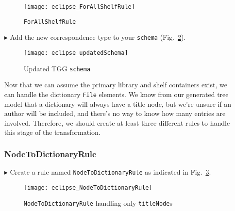\begin{itemize}
\vspace{0.5cm}

\begin{figure}[htbp]
\begin{center}
  \texttt{[image: eclipse\_ForAllShelfRule]}
  \caption{\texttt{ForAllShelfRule}}
  \label{eclipse:ForAllShelvesRule}
\end{center}
\end{figure}

\item[$\blacktriangleright$] Add the new correspondence type to your \texttt{schema} (Fig.~\ref{eclipse:updatedSchema}).

\vspace{0.5cm}

\begin{figure}[h!]
\begin{center}
  \texttt{[image: eclipse\_updatedSchema]}
  \caption{Updated TGG \texttt{schema}}
  \label{eclipse:updatedSchema}
\end{center}
\end{figure}

\newpage

Now that we can assume the primary library and shelf containers exist, we can handle the dictionary \texttt{File} elements. We know from our generated
tree model that a dictionary will always have a title node, but we're unsure if an author will be included, and there's no way to know how many entries are
involved. Therefore, we should create at least three different rules to handle this stage of the transformation. 

\subsubsection{NodeToDictionaryRule} %

\item[$\blacktriangleright$] Create a rule named \texttt{NodeToDictionaryRule} as indicated in Fig.~\ref{eclipse:NodeToDictionaryRule}.

\vspace{0.5cm}

\begin{figure}[htbp]
\begin{center}
  \texttt{[image: eclipse\_NodeToDictionaryRule]}
  \caption{\texttt{NodeToDictionaryRule} handling only \texttt{titleNode}s}
  \label{eclipse:NodeToDictionaryRule}
\end{center}
\end{figure}


\end{itemize}

